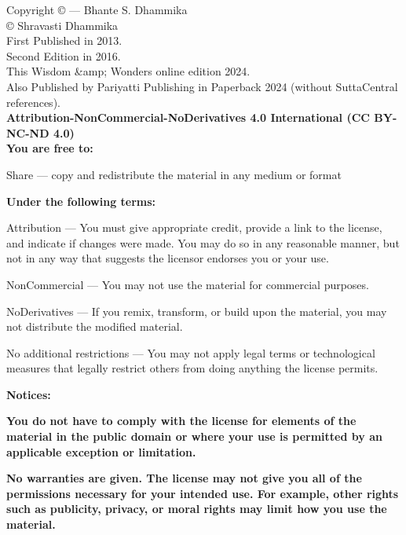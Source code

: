 \documentclass[10pt, openright]{book}
\begin{document}
\newpage
\begin{small}
\begin{sffamily}
\noindent Copyright © — Bhante S. Dhammika\\

\noindent © Shravasti Dhammika\\\noindent First Published in 2013.\\\noindent Second Edition in 2016.\\\noindent This Wisdom &amp; Wonders online edition 2024.\\\noindent Also Published by Pariyatti Publishing in Paperback 2024 (without SuttaCentral references).\\

\noindent\textbf{Attribution-NonCommercial-NoDerivatives 4.0 International (CC BY-NC-ND 4.0)}\\



\noindent\textbf{You are free to:}

\noindent Share — copy and redistribute the material in any medium or format


\noindent\textbf{Under the following terms:}

\noindent Attribution — You must give appropriate credit, provide a link to the license, and indicate if changes were made. You may do so in any reasonable manner, but not in any way that suggests the licensor endorses you or your use.

\noindent NonCommercial — You may not use the material for commercial purposes.

\noindent NoDerivatives — If you remix, transform, or build upon the material, you may not distribute the modified material.

\noindent No additional restrictions — You may not apply legal terms or technological measures that legally restrict others from doing anything the license permits.


\noindent\textbf{Notices:}


\noindent\textbf{You do not have to comply with the license for elements of the material in the public domain or where your use is permitted by an applicable exception or limitation.}


\noindent\textbf{No warranties are given. The license may not give you all of the permissions necessary for your intended use. For example, other rights such as publicity, privacy, or moral rights may limit how you use the material.}

\end{sffamily}
\end{small}
\end{document}
